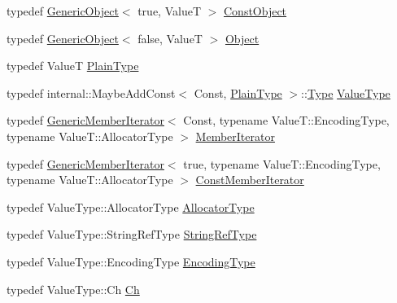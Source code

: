 \begin{DoxyCompactItemize}
\item 
typedef \mbox{\hyperlink{classrapidjson_1_1_generic_object}{Generic\+Object}}$<$ true, ValueT $>$ \mbox{\hyperlink{classrapidjson_1_1_generic_object_a00d71a7ee4d903e74fdc5a83750dd0f7}{Const\+Object}}
\item 
typedef \mbox{\hyperlink{classrapidjson_1_1_generic_object}{Generic\+Object}}$<$ false, ValueT $>$ \mbox{\hyperlink{classrapidjson_1_1_generic_object_a046e47c2bc624f677603d34d0f108347}{Object}}
\item 
typedef ValueT \mbox{\hyperlink{classrapidjson_1_1_generic_object_a46c7868bddba87a819cccca94bbdbda9}{Plain\+Type}}
\item 
typedef internal\+::\+Maybe\+Add\+Const$<$ Const, \mbox{\hyperlink{classrapidjson_1_1_generic_object_a46c7868bddba87a819cccca94bbdbda9}{Plain\+Type}} $>$\+::\mbox{\hyperlink{namespacerapidjson_ae79a4751c1c460ff0de5ecc07874f3e4}{Type}} \mbox{\hyperlink{classrapidjson_1_1_generic_object_a282660500748eff5ebab93b88a9d478f}{Value\+Type}}
\item 
typedef \mbox{\hyperlink{classrapidjson_1_1_generic_member_iterator}{Generic\+Member\+Iterator}}$<$ Const, typename Value\+T\+::\+Encoding\+Type, typename Value\+T\+::\+Allocator\+Type $>$ \mbox{\hyperlink{classrapidjson_1_1_generic_object_a598fd1d5f55289eca275847f0e8ef295}{Member\+Iterator}}
\item 
typedef \mbox{\hyperlink{classrapidjson_1_1_generic_member_iterator}{Generic\+Member\+Iterator}}$<$ true, typename Value\+T\+::\+Encoding\+Type, typename Value\+T\+::\+Allocator\+Type $>$ \mbox{\hyperlink{classrapidjson_1_1_generic_object_a579a7d7ab7102bcf86c948d0df3d2f2d}{Const\+Member\+Iterator}}
\item 
typedef Value\+Type\+::\+Allocator\+Type \mbox{\hyperlink{classrapidjson_1_1_generic_object_ae30003e248368737382eed69ec8fe1eb}{Allocator\+Type}}
\item 
typedef Value\+Type\+::\+String\+Ref\+Type \mbox{\hyperlink{classrapidjson_1_1_generic_object_ab47bc8d841321d77c140e9df729f5233}{String\+Ref\+Type}}
\item 
typedef Value\+Type\+::\+Encoding\+Type \mbox{\hyperlink{classrapidjson_1_1_generic_object_ac412c8d073aa02f622b3904e4195425c}{Encoding\+Type}}
\item 
typedef Value\+Type\+::\+Ch \mbox{\hyperlink{classrapidjson_1_1_generic_object_a947f543afbdd5e6d1c5b2dd1fe5a6e60}{Ch}}
\end{DoxyCompactItemize}
